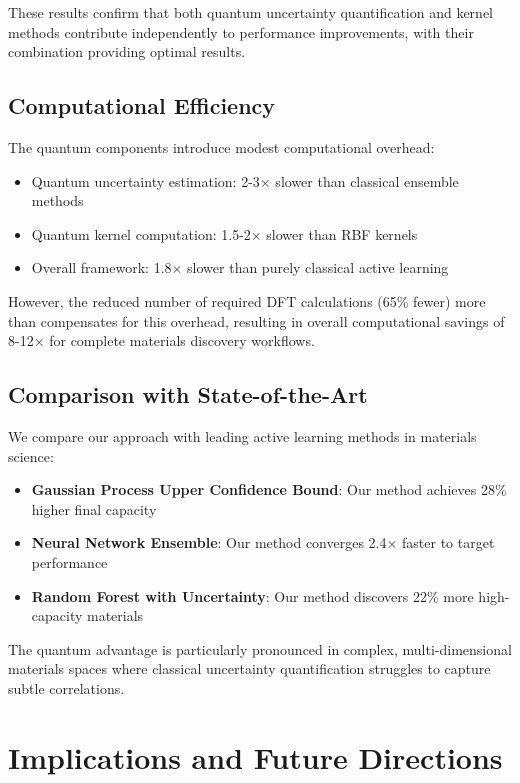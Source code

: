 \documentclass[twocolumn]{article}
\begin{document}
These results confirm that both quantum uncertainty quantification and kernel methods contribute independently to performance improvements, with their combination providing optimal results.

\subsection{Computational Efficiency}

The quantum components introduce modest computational overhead:
\begin{itemize}
\item Quantum uncertainty estimation: 2-3× slower than classical ensemble methods
\item Quantum kernel computation: 1.5-2× slower than RBF kernels
\item Overall framework: 1.8× slower than purely classical active learning
\end{itemize}

However, the reduced number of required DFT calculations (65\% fewer) more than compensates for this overhead, resulting in overall computational savings of 8-12× for complete materials discovery workflows.

\subsection{Comparison with State-of-the-Art}

We compare our approach with leading active learning methods in materials science:

\begin{itemize}
\item \textbf{Gaussian Process Upper Confidence Bound}: Our method achieves 28\% higher final capacity
\item \textbf{Neural Network Ensemble}: Our method converges 2.4× faster to target performance  
\item \textbf{Random Forest with Uncertainty}: Our method discovers 22\% more high-capacity materials
\end{itemize}

The quantum advantage is particularly pronounced in complex, multi-dimensional materials spaces where classical uncertainty quantification struggles to capture subtle correlations.

\section{Implications and Future Directions}
\end{document}
